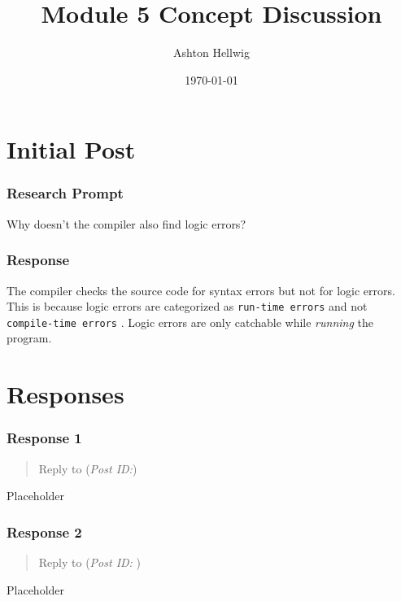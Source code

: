 \documentclass[12pt]{article}
\title{Module 5 Concept Discussion}
\author{Ashton Hellwig}
\date{\today}
\theoremstyle{definition}
\theoremstyle{plain}
\begin{document}
  \maketitle
  \tableofcontents
  \lstlistoflistings
  \newpage


  \part{Initial Post}

    \section{Research Prompt}
      \begin{mdframed}
        Why doesn’t the compiler also find logic errors?
      \end{mdframed}

    \section{Response}
      The compiler checks the source code for syntax errors but not for logic
        errors. This is because logic errors are categorized as
        \texttt{run-time errors} and not \texttt{compile-time errors}
        \cite{pitts_2000}. Logic errors are only catchable while
        \textit{running} the program.


  \newpage
  \part{Responses}

    \section{Response 1}
      \begin{quote}
        Reply to \textbf{} (\textit{Post ID:})
      \end{quote}
      Placeholder

    \section{Response 2}
      \begin{quote}
        Reply to \textbf{} (\textit{Post ID: })
      \end{quote}
      Placeholder

  \newpage
  \nocite{malik_2015}
  \printbibliography[
    heading=bibintoc,
    title={Bibliography}
  ]
\end{document}
